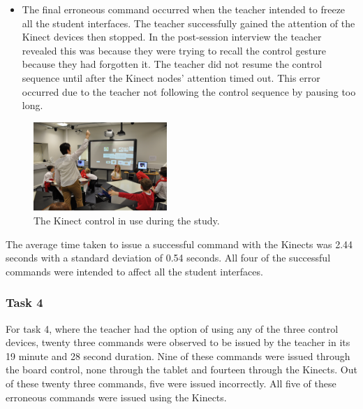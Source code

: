 \documentclass[link]{IWCOMP}
\begin{document}
\begin{itemize}
\item The final erroneous command occurred when the teacher intended to freeze all the student interfaces.
The teacher successfully gained the attention of the Kinect devices then stopped.
In the post-session interview the teacher revealed this was because they were trying to recall the control gesture because they had forgotten it.
The teacher did not resume the control sequence until after the Kinect nodes' attention timed out.
This error occurred due to the teacher not following the control sequence by pausing too long.
\end{itemize}

\begin{figure}[h]
   \centering
   \includegraphics[width=0.45\textwidth]{figures/new_study_kinect.png}
   \caption{The Kinect control in use during the study.}
   \label{fig:studyKinect}
\end{figure}

The average time taken to issue a successful command with the Kinects was 2.44 seconds with a standard deviation of 0.54 seconds.
All four of the successful commands were intended to affect all the student interfaces.

\subsubsection{Task 4}
\label{subsubsec:studyPhase2ResultsTask4}

For task 4, where the teacher had the option of using any of the three control devices, twenty three commands were observed to be issued by the teacher in its 19 minute and 28 second duration.
Nine of these commands were issued through the board control, none through the tablet and fourteen through the Kinects.
Out of these twenty three commands, five were issued incorrectly.
All five of these erroneous commands were issued using the Kinects.
\end{document}
